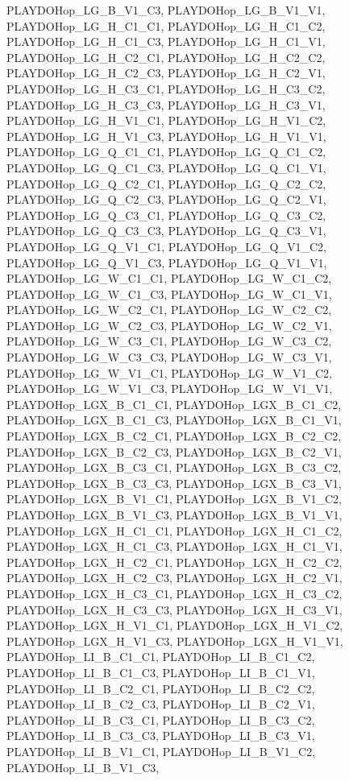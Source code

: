 PLAYDOHop\_\-LG\_\-B\_\-V1\_\-C3, PLAYDOHop\_\-LG\_\-B\_\-V1\_\-V1, PLAYDOHop\_\-LG\_\-H\_\-C1\_\-C1, PLAYDOHop\_\-LG\_\-H\_\-C1\_\-C2, PLAYDOHop\_\-LG\_\-H\_\-C1\_\-C3, PLAYDOHop\_\-LG\_\-H\_\-C1\_\-V1, PLAYDOHop\_\-LG\_\-H\_\-C2\_\-C1, PLAYDOHop\_\-LG\_\-H\_\-C2\_\-C2, PLAYDOHop\_\-LG\_\-H\_\-C2\_\-C3, PLAYDOHop\_\-LG\_\-H\_\-C2\_\-V1, PLAYDOHop\_\-LG\_\-H\_\-C3\_\-C1, PLAYDOHop\_\-LG\_\-H\_\-C3\_\-C2, PLAYDOHop\_\-LG\_\-H\_\-C3\_\-C3, PLAYDOHop\_\-LG\_\-H\_\-C3\_\-V1, PLAYDOHop\_\-LG\_\-H\_\-V1\_\-C1, PLAYDOHop\_\-LG\_\-H\_\-V1\_\-C2, PLAYDOHop\_\-LG\_\-H\_\-V1\_\-C3, PLAYDOHop\_\-LG\_\-H\_\-V1\_\-V1, PLAYDOHop\_\-LG\_\-Q\_\-C1\_\-C1, PLAYDOHop\_\-LG\_\-Q\_\-C1\_\-C2, PLAYDOHop\_\-LG\_\-Q\_\-C1\_\-C3, PLAYDOHop\_\-LG\_\-Q\_\-C1\_\-V1, PLAYDOHop\_\-LG\_\-Q\_\-C2\_\-C1, PLAYDOHop\_\-LG\_\-Q\_\-C2\_\-C2, PLAYDOHop\_\-LG\_\-Q\_\-C2\_\-C3, PLAYDOHop\_\-LG\_\-Q\_\-C2\_\-V1, PLAYDOHop\_\-LG\_\-Q\_\-C3\_\-C1, PLAYDOHop\_\-LG\_\-Q\_\-C3\_\-C2, PLAYDOHop\_\-LG\_\-Q\_\-C3\_\-C3, PLAYDOHop\_\-LG\_\-Q\_\-C3\_\-V1, PLAYDOHop\_\-LG\_\-Q\_\-V1\_\-C1, PLAYDOHop\_\-LG\_\-Q\_\-V1\_\-C2, PLAYDOHop\_\-LG\_\-Q\_\-V1\_\-C3, PLAYDOHop\_\-LG\_\-Q\_\-V1\_\-V1, PLAYDOHop\_\-LG\_\-W\_\-C1\_\-C1, PLAYDOHop\_\-LG\_\-W\_\-C1\_\-C2, PLAYDOHop\_\-LG\_\-W\_\-C1\_\-C3, PLAYDOHop\_\-LG\_\-W\_\-C1\_\-V1, PLAYDOHop\_\-LG\_\-W\_\-C2\_\-C1, PLAYDOHop\_\-LG\_\-W\_\-C2\_\-C2, PLAYDOHop\_\-LG\_\-W\_\-C2\_\-C3, PLAYDOHop\_\-LG\_\-W\_\-C2\_\-V1, PLAYDOHop\_\-LG\_\-W\_\-C3\_\-C1, PLAYDOHop\_\-LG\_\-W\_\-C3\_\-C2, PLAYDOHop\_\-LG\_\-W\_\-C3\_\-C3, PLAYDOHop\_\-LG\_\-W\_\-C3\_\-V1, PLAYDOHop\_\-LG\_\-W\_\-V1\_\-C1, PLAYDOHop\_\-LG\_\-W\_\-V1\_\-C2, PLAYDOHop\_\-LG\_\-W\_\-V1\_\-C3, PLAYDOHop\_\-LG\_\-W\_\-V1\_\-V1, PLAYDOHop\_\-LGX\_\-B\_\-C1\_\-C1, PLAYDOHop\_\-LGX\_\-B\_\-C1\_\-C2, PLAYDOHop\_\-LGX\_\-B\_\-C1\_\-C3, PLAYDOHop\_\-LGX\_\-B\_\-C1\_\-V1, PLAYDOHop\_\-LGX\_\-B\_\-C2\_\-C1, PLAYDOHop\_\-LGX\_\-B\_\-C2\_\-C2, PLAYDOHop\_\-LGX\_\-B\_\-C2\_\-C3, PLAYDOHop\_\-LGX\_\-B\_\-C2\_\-V1, PLAYDOHop\_\-LGX\_\-B\_\-C3\_\-C1, PLAYDOHop\_\-LGX\_\-B\_\-C3\_\-C2, PLAYDOHop\_\-LGX\_\-B\_\-C3\_\-C3, PLAYDOHop\_\-LGX\_\-B\_\-C3\_\-V1, PLAYDOHop\_\-LGX\_\-B\_\-V1\_\-C1, PLAYDOHop\_\-LGX\_\-B\_\-V1\_\-C2, PLAYDOHop\_\-LGX\_\-B\_\-V1\_\-C3, PLAYDOHop\_\-LGX\_\-B\_\-V1\_\-V1, PLAYDOHop\_\-LGX\_\-H\_\-C1\_\-C1, PLAYDOHop\_\-LGX\_\-H\_\-C1\_\-C2, PLAYDOHop\_\-LGX\_\-H\_\-C1\_\-C3, PLAYDOHop\_\-LGX\_\-H\_\-C1\_\-V1, PLAYDOHop\_\-LGX\_\-H\_\-C2\_\-C1, PLAYDOHop\_\-LGX\_\-H\_\-C2\_\-C2, PLAYDOHop\_\-LGX\_\-H\_\-C2\_\-C3, PLAYDOHop\_\-LGX\_\-H\_\-C2\_\-V1, PLAYDOHop\_\-LGX\_\-H\_\-C3\_\-C1, PLAYDOHop\_\-LGX\_\-H\_\-C3\_\-C2, PLAYDOHop\_\-LGX\_\-H\_\-C3\_\-C3, PLAYDOHop\_\-LGX\_\-H\_\-C3\_\-V1, PLAYDOHop\_\-LGX\_\-H\_\-V1\_\-C1, PLAYDOHop\_\-LGX\_\-H\_\-V1\_\-C2, PLAYDOHop\_\-LGX\_\-H\_\-V1\_\-C3, PLAYDOHop\_\-LGX\_\-H\_\-V1\_\-V1, PLAYDOHop\_\-LI\_\-B\_\-C1\_\-C1, PLAYDOHop\_\-LI\_\-B\_\-C1\_\-C2, PLAYDOHop\_\-LI\_\-B\_\-C1\_\-C3, PLAYDOHop\_\-LI\_\-B\_\-C1\_\-V1, PLAYDOHop\_\-LI\_\-B\_\-C2\_\-C1, PLAYDOHop\_\-LI\_\-B\_\-C2\_\-C2, PLAYDOHop\_\-LI\_\-B\_\-C2\_\-C3, PLAYDOHop\_\-LI\_\-B\_\-C2\_\-V1, PLAYDOHop\_\-LI\_\-B\_\-C3\_\-C1, PLAYDOHop\_\-LI\_\-B\_\-C3\_\-C2, PLAYDOHop\_\-LI\_\-B\_\-C3\_\-C3, PLAYDOHop\_\-LI\_\-B\_\-C3\_\-V1, PLAYDOHop\_\-LI\_\-B\_\-V1\_\-C1, PLAYDOHop\_\-LI\_\-B\_\-V1\_\-C2, PLAYDOHop\_\-LI\_\-B\_\-V1\_\-C3, 
